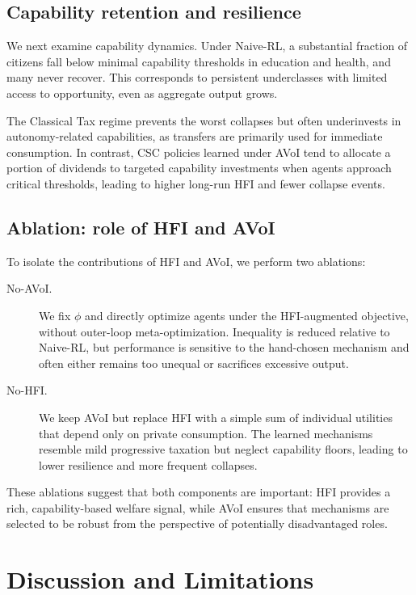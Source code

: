 \documentclass{article}
\begin{document}
\subsection{Capability retention and resilience}
\label{subsec:resilience}

We next examine capability dynamics. Under Naive-RL, a substantial fraction of citizens fall below minimal capability thresholds in education and health, and many never recover. This corresponds to persistent underclasses with limited access to opportunity, even as aggregate output grows.

The Classical Tax regime prevents the worst collapses but often underinvests in autonomy-related capabilities, as transfers are primarily used for immediate consumption. In contrast, CSC policies learned under AVoI tend to allocate a portion of dividends to targeted capability investments when agents approach critical thresholds, leading to higher long-run HFI and fewer collapse events.

\subsection{Ablation: role of HFI and AVoI}
\label{subsec:ablation}

To isolate the contributions of HFI and AVoI, we perform two ablations:

\begin{description}
  \item[No-AVoI.] We fix $\phi$ and directly optimize agents under the HFI-augmented objective, without outer-loop meta-optimization. Inequality is reduced relative to Naive-RL, but performance is sensitive to the hand-chosen mechanism and often either remains too unequal or sacrifices excessive output.
  \item[No-HFI.] We keep AVoI but replace HFI with a simple sum of individual utilities that depend only on private consumption. The learned mechanisms resemble mild progressive taxation but neglect capability floors, leading to lower resilience and more frequent collapses.
\end{description}

These ablations suggest that both components are important: HFI provides a rich, capability-based welfare signal, while AVoI ensures that mechanisms are selected to be robust from the perspective of potentially disadvantaged roles.

\section{Discussion and Limitations}
\label{sec:discussion}
\end{document}
